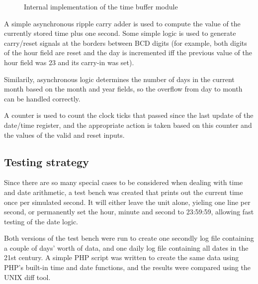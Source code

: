 \documentclass[a4paper]{article}
\begin{document}
\begin{figure}
\begin{center}
	\end{center}
	\caption{Internal implementation of the time buffer module}
\end{figure}

A simple asynchronous ripple carry adder is used to compute the value of the
currently stored time plus one second. Some simple logic is used to generate
carry/reset signals at the borders between BCD digits (for example, both digits
of the hour field are reset and the day is incremented iff the previous value
of the hour field was 23 and its carry-in was set).

Similarily, asynchronous logic determines the number of days in the current
month based on the month and year fields, so the overflow from day to month can
be handled correctly.

A counter is used to count the clock ticks that passed since the last update of
the date/time register, and the appropriate action is taken based on this
counter and the values of the valid and reset inputs.

\subsection{Testing strategy}

Since there are so many special cases to be considered when dealing with time
and date arithmetic, a test bench was created that prints out the current time
once per simulated second. It will either leave the unit alone, yieling one
line per second, or permanently set the hour, minute and second to 23:59:59,
allowing fast testing of the date logic.

Both versions of the test bench were run to create one secondly log file
containing a couple of days' worth of data, and one daily log file containing
all dates in the 21st century. A simple PHP script was written to create the
same data using PHP's built-in time and date functions, and the results were
compared using the UNIX diff tool.
\end{document}
